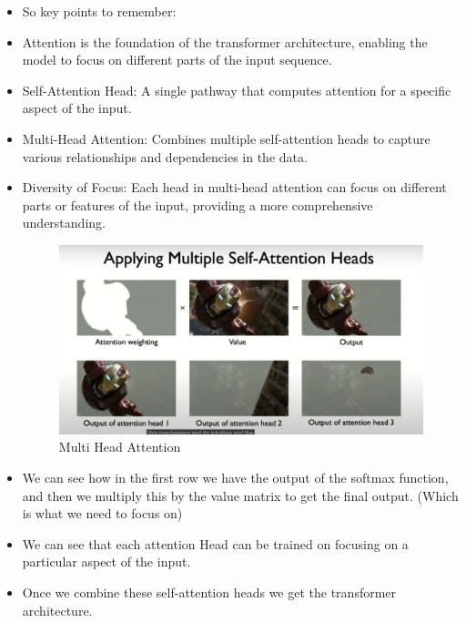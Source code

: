 \documentclass{article}
\begin{document}
\begin{itemize}
    \item So key points to remember: \\
    \item Attention is the foundation of the transformer architecture, enabling the model to focus on different parts of the input sequence.
    \item Self-Attention Head: A single pathway that computes attention for a specific aspect of the input.
    \item Multi-Head Attention: Combines multiple self-attention heads to capture various relationships and dependencies in the data.
    \item Diversity of Focus: Each head in multi-head attention can focus on different parts or features of the input, providing a more comprehensive understanding.
    \begin{figure}[H]
      \centering
      \includegraphics[width = \textwidth]{Images/multi_head.png}
      \caption{Multi Head Attention}
    \end{figure}
    \item We can see how in the first row we have the output of the softmax function, and then we multiply this by the value matrix to get the final output. (Which is what we need to focus on)
    \item We can see that each attention Head can be trained on focusing on a particular aspect of the input.
    \item Once we combine these self-attention heads we get the transformer architecture.
  \end{itemize}
\end{document}
